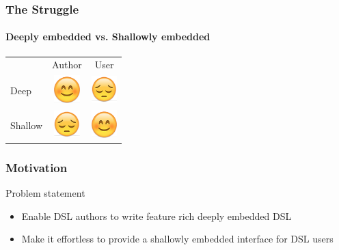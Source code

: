 \documentclass[xcolor=dvipsnames]{beamer}
\theoremstyle{definition}
\begin{document}
\begin{frame}[fragile]
    \frametitle{The Struggle}
    \framesubtitle{Deeply embedded vs. Shallowly embedded}
    \huge
    \begin{center}
        \begin{tabular}{lcc}
                    & Author & User   \\
            Deep    &   \includegraphics[width=1cm]{img/happy.png}   & \includegraphics[width=1cm]{img/sad.png}    \\
            Shallow &   \includegraphics[width=1cm]{img/sad.png}     & \includegraphics[width=1cm]{img/happy.png}  \\
        \end{tabular}
    \end{center}
\end{frame}

\begin{frame}[fragile]
    \frametitle{Motivation}
    \begin{block}{Problem statement}
        \begin{itemize}
            \item Enable DSL authors to write feature rich deeply embedded DSL
            \item Make it effortless to provide a shallowly embedded interface for DSL users
        \end{itemize}
    \end{block}
\end{frame}
\end{document}
